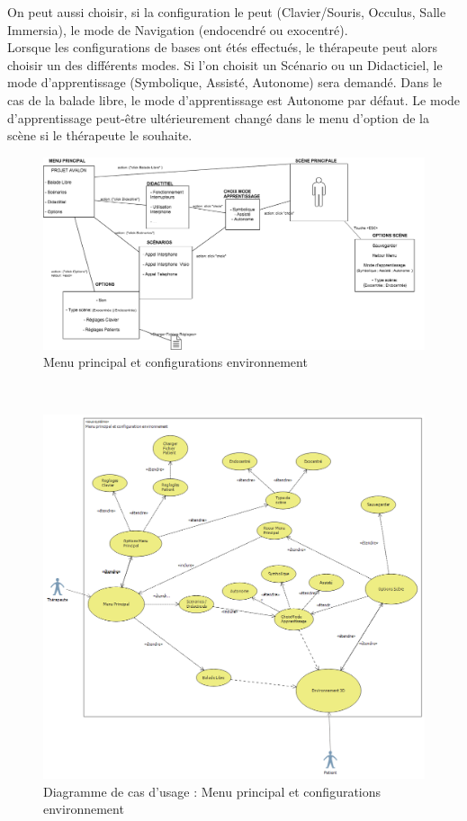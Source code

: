On peut aussi choisir, si la configuration le peut (Clavier/Souris, Occulus, Salle Immersia), le mode de Navigation (endocendré ou exocentré). 
\\
Lorsque les configurations de bases ont étés effectués, le thérapeute peut alors choisir un des différents modes. Si l'on choisit un Scénario ou un Didacticiel, le mode d'apprentissage (Symbolique, Assisté, Autonome) sera demandé. Dans le cas de la balade libre, le mode d'apprentissage est Autonome par défaut. Le mode d'apprentissage peut-être ultérieurement changé dans le menu d'option de la scène si le thérapeute le souhaite. 
\\

\begin{figure}[h]
\centering
\includegraphics[width=1\textwidth]{img-utilisateur/menu.png}
\caption{\label{fig:Menu} Menu principal et configurations environnement }
\end{figure}
\\
\begin{figure}[h]
\centering
\includegraphics[width=1\textwidth]{img-utilisateur/cas-usage-menu.png}
\caption{\label{fig:CasUsageMenu} Diagramme de cas d'usage : Menu principal et configurations environnement }
\end{figure}
\FloatBarrier 


